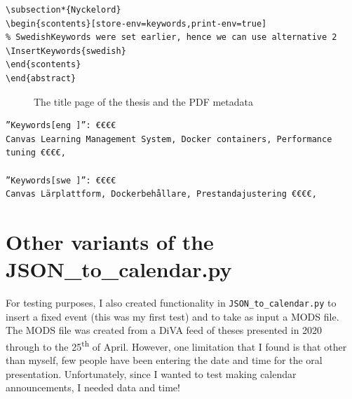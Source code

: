 \begin{lstlisting}[language={[LaTeX]TeX}, caption={Including the Swedish language keywords below the Swedish abstract}, label=lst:keywordsSectionSwedish]
\subsection*{Nyckelord}
\begin{scontents}[store-env=keywords,print-env=true]
% SwedishKeywords were set earlier, hence we can use alternative 2
\InsertKeywords{swedish}
\end{scontents}
\end{abstract}
\end{lstlisting}



\begin{figure}[!ht]
  \begin{center}
  \end{center}
  \caption{The title page of the thesis and the PDF metadata}
  \label{fig:pdfMetadata}
\end{figure}
\FloatBarrier	
{}
\begin{lstlisting}[language={[LaTeX]TeX}, caption={The keywords appear as expected in the For DiVA data at the end of the PDF file}, label=lst:keywordsFromForDIVA]	
”Keywords[eng ]”: €€€€
Canvas Learning Management System, Docker containers, Performance tuning €€€€,

”Keywords[swe ]”: €€€€
Canvas Lärplattform, Dockerbehållare, Prestandajustering €€€€,
\end{lstlisting}

\section{Other variants of the JSON\_to\_calendar.py}
\label{sec:otherVariantsofJSONtoCalendar}
For testing purposes, I also created functionality in \texttt{JSON\_to\_calendar.py} to insert a fixed event (this was my first test) and to take as input a MODS file. The MODS file was created from a DiVA feed of theses presented in 2020 through to the 25\textsuperscript{th} of April. However, one limitation that I found is that other than myself, few people have been entering the date and time for the oral presentation. Unfortunately, since I wanted to test making calendar announcements, I needed data and time!

